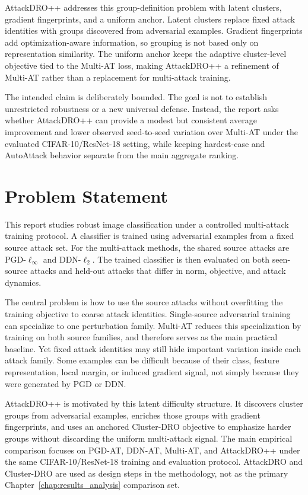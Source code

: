 AttackDRO++ addresses this group-definition problem with latent clusters,
gradient fingerprints, and a uniform anchor.  Latent clusters replace fixed
attack identities with groups discovered from adversarial examples.  Gradient
fingerprints add optimization-aware information, so grouping is not based only
on representation similarity.  The uniform anchor keeps the adaptive
cluster-level objective tied to the Multi-AT loss, making AttackDRO++ a
refinement of Multi-AT rather than a replacement for multi-attack training.

The intended claim is deliberately bounded.  The goal is not to establish
unrestricted robustness or a new universal defense.  Instead, the report asks
whether AttackDRO++ can provide a modest but consistent average improvement and
lower observed seed-to-seed variation over Multi-AT under the evaluated
CIFAR-10/ResNet-18 setting, while keeping hardest-case and AutoAttack behavior
separate from the main aggregate ranking.

\section{Problem Statement}

This report studies robust image classification under a controlled multi-attack
training protocol.  A classifier is trained using adversarial examples from a
fixed source attack set.  For the multi-attack methods, the shared source
attacks are PGD-\(\ell_\infty\) and DDN-\(\ell_2\).  The trained classifier is
then evaluated on both seen-source attacks and held-out attacks that differ in
norm, objective, and attack dynamics.

The central problem is how to use the source attacks without overfitting the
training objective to coarse attack identities.  Single-source adversarial
training can specialize to one perturbation family.  Multi-AT reduces this
specialization by training on both source families, and therefore serves as the
main practical baseline.  Yet fixed attack identities may still hide important
variation inside each attack family.  Some examples can be difficult because of
their class, feature representation, local margin, or induced gradient signal,
not simply because they were generated by PGD or DDN.

AttackDRO++ is motivated by this latent difficulty structure.  It discovers
cluster groups from adversarial examples, enriches those groups with gradient
fingerprints, and uses an anchored Cluster-DRO objective to emphasize harder
groups without discarding the uniform multi-attack signal.  The main empirical
comparison focuses on PGD-AT, DDN-AT, Multi-AT, and AttackDRO++ under the same
CIFAR-10/ResNet-18 training and evaluation protocol.  AttackDRO and Cluster-DRO
are used as design steps in the methodology, not as the primary
Chapter~\ref{chap:results_analysis} comparison set.

